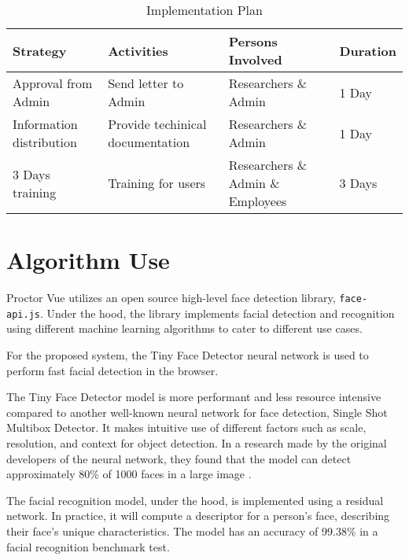 \vspace{1cm}

\begin{table}[h!]
    \begin{center}
        \begin{tabular}{|m{10em}|m{8em}|m{10em}|m{4em}|}
            \hline
            \textbf{Strategy}        & \textbf{Activities}              & \textbf{Persons Involved}         & \textbf{Duration} \\
            \hline
            Approval from Admin      & Send letter to Admin             & Researchers \& Admin              & 1 Day             \\
            \hline
            Information distribution & Provide techinical documentation & Researchers \& Admin              & 1 Day             \\
            \hline
            3 Days training          & Training for users               & Researchers \& Admin \& Employees & 3 Days            \\
            \hline
        \end{tabular}
    \end{center}
    \caption{Implementation Plan}
\end{table}

\section{Algorithm Use}

Proctor Vue utilizes an open source high-level face detection library, \lstinline{face-api.js}.
Under the hood, the library implements facial detection and recognition using different machine learning algorithms to cater to different use cases.

For the proposed system, the Tiny Face Detector neural network is used to perform fast facial detection in the browser.

The Tiny Face Detector model is more performant and less resource intensive compared to another well-known neural network for face detection, Single Shot Multibox Detector.
It makes intuitive use of different factors such as scale, resolution, and context for object detection.
In a research made by the original developers of the neural network, they found that the model can detect approximately 80\% of 1000 faces in a large image \cite{Hu_2017_CVPR}.

The facial recognition model, under the hood, is implemented using a residual network.
In practice, it will compute a descriptor for a person's face, describing their face's unique characteristics.
The model has an accuracy of 99.38\% in a facial recognition benchmark test.
